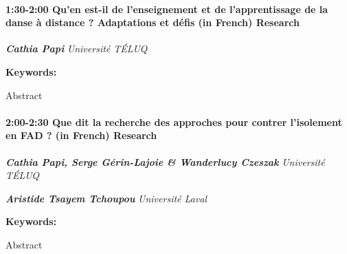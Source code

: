 \documentclass[
]{book}
\begin{document}
\begin{session}
\hypertarget{quen-est-il-de-lenseignement-et-de-lapprentissage-de-la-danse-uxe0-distance-adaptations-et-duxe9fis-in-french-research}{%
\paragraph*{\texorpdfstring{1:30-2:00 \textbar{} \textbf{Qu'en est-il de
l'enseignement et de l'apprentissage de la danse à distance ?
Adaptations et défis (in French)} \textbar{}
Research}{1:30-2:00 \textbar{} Qu'en est-il de l'enseignement et de l'apprentissage de la danse à distance ? Adaptations et défis (in French) \textbar{} Research}}\label{quen-est-il-de-lenseignement-et-de-lapprentissage-de-la-danse-uxe0-distance-adaptations-et-duxe9fis-in-french-research}}

\textbf{\emph{Cathia Papi}} \textbar{} \emph{Université TÉLUQ}

\textbf{Keywords:}

Abstract
\end{session}

\begin{session}
\hypertarget{que-dit-la-recherche-des-approches-pour-contrer-lisolement-en-fad-in-french-research}{%
\paragraph*{\texorpdfstring{2:00-2:30 \textbar{} \textbf{Que dit la
recherche des approches pour contrer l'isolement en FAD ? (in French)}
\textbar{}
Research}{2:00-2:30 \textbar{} Que dit la recherche des approches pour contrer l'isolement en FAD ? (in French) \textbar{} Research}}\label{que-dit-la-recherche-des-approches-pour-contrer-lisolement-en-fad-in-french-research}}

\textbf{\emph{Cathia Papi, Serge Gérin-Lajoie \& Wanderlucy Czeszak}}
\textbar{} \emph{Université TÉLUQ}

\textbf{\emph{Aristide Tsayem Tchoupou}} \textbar{} \emph{Université
Laval}

\textbf{Keywords:}

Abstract
\end{session}
\end{document}
